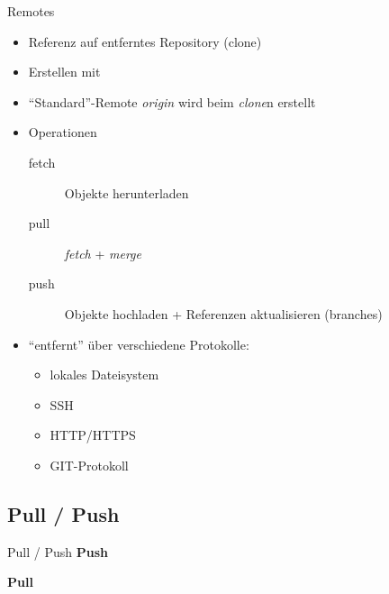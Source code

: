 \begin{frame}{Remotes}
    \begin{itemize}
        \item Referenz auf entferntes Repository (clone)
        \item Erstellen mit
        \item ``Standard''-Remote \emph{origin} wird beim \emph{clone}n erstellt
        \item Operationen
            \begin{description}
                \item[fetch] Objekte herunterladen
                \item[pull] \emph{fetch} + \emph{merge}
                \item[push] Objekte hochladen + Referenzen aktualisieren (branches)
            \end{description}
        \item ``entfernt'' über verschiedene Protokolle:
            \begin{itemize}
                \item lokales Dateisystem
                \item SSH
                \item HTTP/HTTPS
                \item GIT-Protokoll
            \end{itemize}
    \end{itemize}
\end{frame}

\subsection{Pull / Push}
\begin{frame}{Pull / Push}
    \textbf{Push}\\[0.5em]


    \vspace{1em}

    \textbf{Pull}\\[0.5em]

\end{frame}

